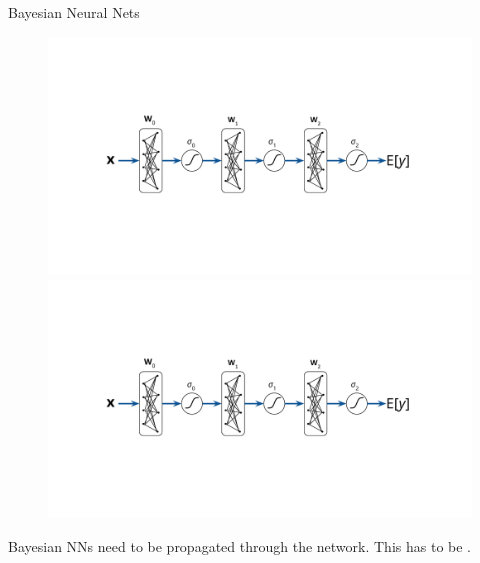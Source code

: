 \documentclass[lualatex, aspectratio=169]{beamer}
\begin{document}
\begin{frame}{Bayesian Neural Nets}

  \begin{figure}
    \includegraphics[page=1, trim={3cm 4.5cm 3cm 4.5cm}, clip, width=0.6\pagewidth]{assets/pictures.pdf}
    \includegraphics[page=3, trim={3cm 4.5cm 3cm 4.5cm}, clip, width=0.6\pagewidth]{assets/pictures.pdf}
  \end{figure}

  Bayesian NNs need  to be propagated through the network. This has to be .

\end{frame}
\end{document}
